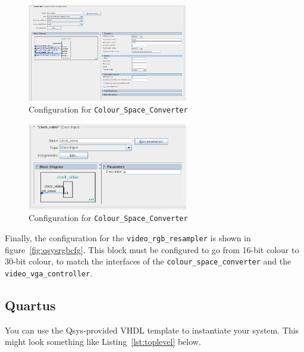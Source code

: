 \documentclass{capstonedoc}
\begin{document}
\begin{figure}[ht]
  \centering
  \includegraphics[width=7cm]{qsys_i_4}
  \caption{Configuration for \texttt{Colour\_Space\_Converter}}
  \label{fig:qsysvidfbcfg}
\end{figure}

\begin{figure}[ht]
  \centering
  \includegraphics[width=7cm]{qsys_i_5}
  \caption{Configuration for \texttt{Colour\_Space\_Converter}}
  \label{fig:qsysvidfbcfg}
\end{figure}

Finally, the configuration for the \texttt{video\_rgb\_resampler} is shown
in figure~\ref{fig:qsysrgbcfg}. This block must be configured to go from
16-bit colour to 30-bit colour, to match the interfaces of the
\texttt{colour\_space\_converter} and the \texttt{video\_vga\_controller}.


\subsection{Quartus}

You can use the Qsys-provided VHDL template to instantiate your system. This
might look something like Listing~\ref{lst:toplevel} below.
\end{document}
